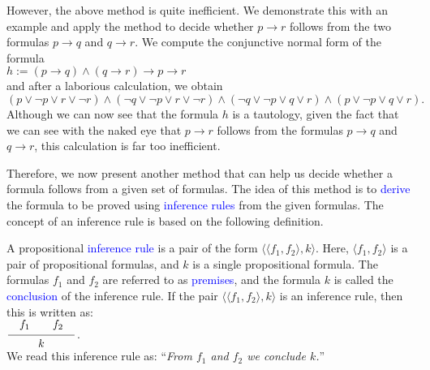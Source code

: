 However, the above method is quite inefficient. We demonstrate this with an
example and apply the method
to decide whether $p \rightarrow r$ follows from the two formulas $p \rightarrow q$ and
$q \rightarrow r$. We compute the conjunctive normal form of the formula
\\[0.2cm]
\hspace*{1.3cm}
$h := (p \rightarrow q) \wedge (q \rightarrow r) \rightarrow p \rightarrow r$
\\[0.2cm]
and after a laborious calculation, we obtain
\\[0.2cm]
\hspace*{1.3cm}
$(p \vee \neg p \vee r \vee \neg r) \wedge (\neg q \vee \neg p \vee r \vee \neg r) \wedge
     (\neg q \vee \neg p \vee q \vee r) \wedge (p \vee \neg p \vee q \vee r).
$
\\[0.2cm]
Although we can now see that the formula $h$ is a tautology, given the
fact that we can see with the naked eye that $p \rightarrow r$ follows from the formulas $p \rightarrow q$ and
$q \rightarrow r$, this calculation is far too inefficient.

Therefore, we now present another method that can help us decide
whether a formula follows from a given set of formulas. The idea of this method
is to \textcolor{blue}{derive} the formula to be proved using \textcolor{blue}{inference rules} from the
given formulas. The concept of an inference rule is based on the following definition. 
\begin{Definition} \hspace*{\fill} \linebreak
    A propositional \textcolor{blue}{inference rule} is a pair of the form  $\bigl\langle \langle f_1, f_2 \rangle, k \bigr\rangle$.
    Here, $\langle f_1, f_2 \rangle$ is a pair of propositional formulas, and $k$ is a
    single propositional formula.  
    The formulas $f_1$ and $f_2$ are referred to as
    \textcolor{blue}{premises}, and the formula $k$ is called the \textcolor{blue}{conclusion} of the inference rule.
    If the pair $\bigl\langle \langle f_1, f_2 \rangle, k \bigr\rangle$ is an inference rule, then this is written as: 
    \\[0.3cm]
    \hspace*{1.3cm}      
    $\schluss{f_1 \qquad f_2}{k}$.
    \\[0.3cm]
    We read this inference rule as: 
    ``\textsl{From $f_1$ and $f_2$ we  conclude $k$.}''
    \eox
\end{Definition}

